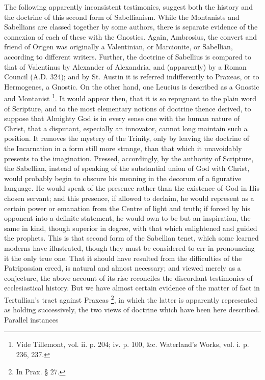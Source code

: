 The following apparently inconsistent testimonies, suggest both the
history and the doctrine of this second form of Sabellianism. While
the Montanists and Sabellians are classed together by some authors,
there is separate evidence of the connexion of each of these with the
Gnostics. Again, Ambrosius, the convert and friend of Origen was
originally a Valentinian, or Marcionite, or Sabellian, according to
different writers. Further, the doctrine of Sabellius is compared to
that of Valentinus by Alexander of Alexandria, and (apparently) by a
Roman Council (A.D. 324); and by St. Austin it
is referred indifferently to Praxeas, or to Hermogenes, a Gnostic. On
the other hand, one Leucius is described as a Gnostic and Montanist \footnote{Vide Tillemont, vol. ii. p. 204; iv. p.
100, \&c. Waterland's Works, vol. i. p. 236, 237.}. It would appear then, that it is so repugnant to the plain
word of Scripture, and to the most elementary notions of
doctrine thence derived, to suppose that Almighty God is in every
sense one with the human nature of Christ, that a disputant,
especially an innovator, cannot long maintain such a position. It
removes the mystery of the Trinity, only by leaving the doctrine of
the Incarnation in a form still more strange, than that which it
unavoidably presents to the imagination. Pressed, accordingly, by the
authority of Scripture, the Sabellian, instead of speaking of the
substantial union of God with Christ, would probably begin to obscure
his meaning in the decorum of a figurative language. He would speak of
the presence rather than the existence of God in His chosen servant;
and this presence, if allowed to declaim, he would represent as a
certain power or emanation from the Centre of light and truth; if
forced by his opponent into a definite statement, he would own to be
but an inspiration, the same in kind, though superior in degree, with
that which enlightened and guided the prophets. This is that second
form of the Sabellian tenet, which some learned moderns have
illustrated, though they must be considered to err in pronouncing it
the only true one. That it should have resulted from the difficulties
of the Patripassian creed, is natural and almost necessary; and viewed
merely as a conjecture, the above account of its rise reconciles the
discordant testimonies of ecclesiastical history. But we have almost
certain evidence of the matter of fact in Tertullian's tract against
Praxeas \footnote{In Prax. § 27.}, in which the
latter is apparently represented as holding successively, the two
views of doctrine which have been here described. Parallel instances
